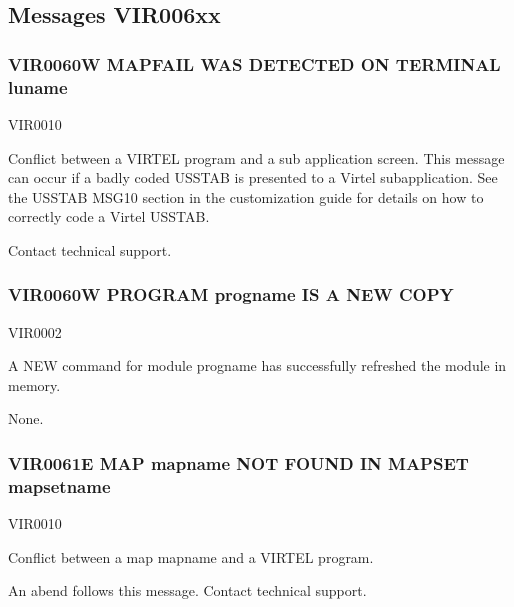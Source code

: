 \documentclass[letterpaper,10pt,english]{sphinxmanual}
\begin{document}
\subsection{Messages VIR006xx}
\label{\detokenize{messages:messages-vir006xx}}

\subsubsection{VIR0060W MAPFAIL WAS DETECTED ON TERMINAL luname}
\label{\detokenize{messages:vir0060w-mapfail-was-detected-on-terminal-luname}}\begin{description}
\sphinxAtStartPar
VIR0010

\sphinxAtStartPar
Conflict between a VIRTEL program and a sub application screen. This message can occur if a badly coded USSTAB is presented to a Virtel sub\sphinxhyphen{}application. See the USSTAB MSG10 section in the customization guide for details on how to correctly code a Virtel USSTAB.

\sphinxAtStartPar
Contact technical support.

\end{description}


\subsubsection{VIR0060W PROGRAM progname IS A NEW COPY}
\label{\detokenize{messages:vir0060w-program-progname-is-a-new-copy}}\begin{description}
\sphinxAtStartPar
VIR0002

\sphinxAtStartPar
A NEW command for module progname has successfully refreshed the module in memory.

\sphinxAtStartPar
None.

\end{description}


\subsubsection{VIR0061E MAP mapname NOT FOUND IN MAPSET mapsetname}
\label{\detokenize{messages:vir0061e-map-mapname-not-found-in-mapset-mapsetname}}\begin{description}
\sphinxAtStartPar
VIR0010

\sphinxAtStartPar
Conflict between a map mapname and a VIRTEL program.

\sphinxAtStartPar
An abend follows this message. Contact technical support.

\end{description}
\end{document}
